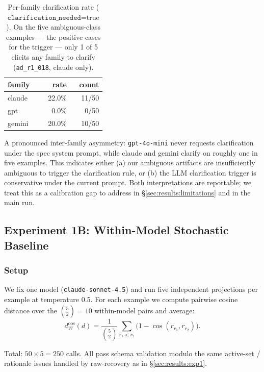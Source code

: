 \begin{table}[t]
\centering
\caption{Per-family clarification rate ($\texttt{clarification\_needed} = \text{true}$). On the five ambiguous-class examples --- the positive cases for the trigger --- only 1 of 5 elicits any family to clarify (\texttt{ad\_r1\_018}, claude only).}
\label{tab:clarification}
\begin{tabular}{lrr}
\toprule
\textbf{family} & \textbf{rate} & \textbf{count} \\
\midrule
claude  & 22.0\% & 11/50 \\
gpt     & 0.0\%  &  0/50 \\
gemini  & 20.0\% & 10/50 \\
\bottomrule
\end{tabular}
\end{table}

A pronounced inter-family asymmetry: \texttt{gpt-4o-mini} never requests clarification under the spec system prompt, while claude and gemini clarify on roughly one in five examples. This indicates either (a) our ambiguous artifacts are insufficiently ambiguous to trigger the clarification rule, or (b) the LLM clarification trigger is conservative under the current prompt. Both interpretations are reportable; we treat this as a calibration gap to address in \S\ref{sec:results:limitations} and in the main run.


\subsection{Experiment 1B: Within-Model Stochastic Baseline}
\label{sec:results:exp1b}

\subsubsection{Setup}
We fix one model (\texttt{claude-sonnet-4.5}) and run five independent projections per example at temperature 0.5. For each example we compute pairwise cosine distance over the $\binom{5}{2} = 10$ within-model pairs and average:
\begin{equation}
d_W^{\cos}(d) = \frac{1}{\binom{5}{2}} \sum_{r_1 < r_2} \bigl( 1 - \cos(r_{r_1}, r_{r_2}) \bigr).
\label{eq:dw_cos}
\end{equation}

Total: $50 \times 5 = 250$ calls. All pass schema validation modulo the same active-set / rationale issues handled by raw-recovery as in \S\ref{sec:results:exp1}.

